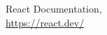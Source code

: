 \singlespace
{}
\begin{thebibliography}{}
	React Documentation,
   \\\url{https://react.dev/}

\end{thebibliography}